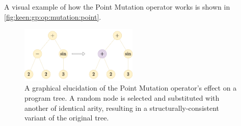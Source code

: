 A visual example of how the Point Mutation operator works is shown in \vref{fig:keen:gp:op:mutation:point}.

\begin{figure}[ht!]
    \centering
    \includegraphics[width=0.5\textwidth]{img/keen/Point mutation.png}
    \caption{
        A graphical elucidation of the Point Mutation operator's effect on a program tree. A random node is selected 
        and substituted with another of identical arity, resulting in a structurally-consistent variant of the 
        original tree.
    }
    \label{fig:keen:gp:op:mutation:point}
\end{figure}
